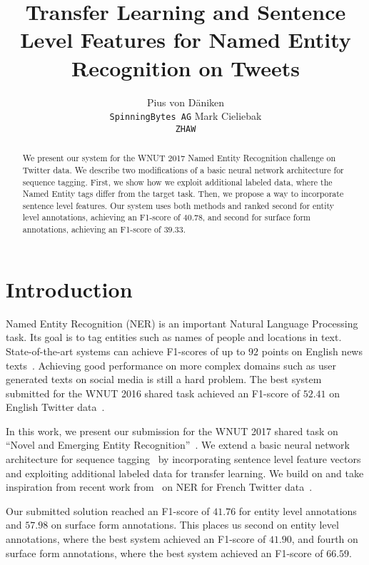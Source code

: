 \documentclass[11pt,letterpaper]{article}
\title{Transfer Learning and Sentence Level Features for Named Entity Recognition on Tweets}
\author{Pius von D\"aniken \\ {\tt SpinningBytes AG} \And Mark Cieliebak \\ {\tt ZHAW}}
\date{}
\begin{document}
\maketitle

\begin{abstract}
    We present our system for the WNUT 2017 Named Entity Recognition challenge 
    on Twitter data. We describe two modifications of a basic neural network architecture
    for sequence tagging. First, we show how we exploit additional labeled data,
    where the Named Entity tags differ from the target task.
    Then, we propose a way to incorporate sentence level features.
    Our system uses both methods and ranked second for entity level annotations,
    achieving an F1-score of $40.78$, and second for surface form annotations,
    achieving an F1-score of $39.33$.
\end{abstract}


\section{Introduction}

Named Entity Recognition (NER) is an important Natural Language Processing task.
Its goal is to tag entities such as names of people and locations in text.
State-of-the-art systems can achieve F1-scores of up to $92$ points on English
news texts~\cite{ner_lstm_cnn}. Achieving good performance on more complex domains
such as user generated texts on social media is still a hard problem. The best
system submitted for the WNUT 2016 shared task achieved an 
F1-score of $52.41$ on English Twitter data~\cite{wnut2016}.

In this work, we present our submission for the WNUT 2017 shared
task on ``Novel and Emerging Entity Recognition''~\cite{wnut2017}.
We extend a basic neural network architecture for sequence tagging~\cite{ner_lstm_cnn, collobert2011}
by incorporating sentence level feature vectors and exploiting additional labeled data for
transfer learning. We build on and take inspiration from recent work from~\cite{studis, synapse}
on NER for French Twitter data~\cite{cap2017}.

Our submitted solution reached an F1-score of $41.76$ for entity level annotations and
$57.98$ on surface form annotations. This places us second on entity level annotations,
where the best system achieved an F1-score of $41.90$, and fourth on surface form
annotations, where the best system achieved an F1-score of $66.59$.
\end{document}
